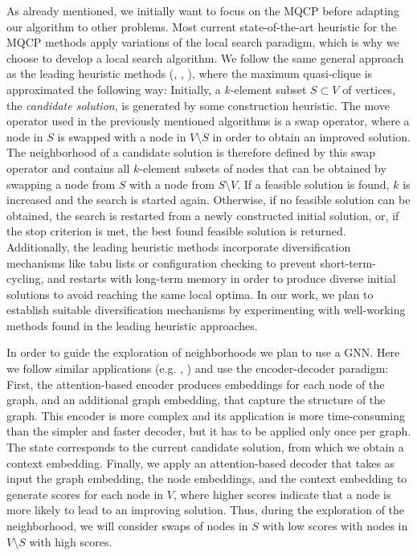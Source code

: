 \documentclass [11pt]{article}
\begin{document}
As already mentioned, we initially want to focus on the MQCP before adapting our algorithm to other problems. Most current state-of-the-art heuristic for the MQCP methods apply variations of the local search paradigm, which is why we choose to develop a local search algorithm. We follow the same general approach as the leading heuristic methods (\cite{djeddi_extension_2019}, \cite{zhou_opposition-based_2020}, \cite{chen_nuqclq_2021}), where the maximum quasi-clique is approximated the following way: Initially, a $k$-element subset $S \subset V$ of vertices, the \textit{candidate solution}, is generated by some construction heuristic. The move operator used in the previously mentioned algorithms is a swap operator, where a node in $S$ is swapped with a node in $V \setminus S$ in order to obtain an improved solution. The neighborhood of a candidate solution is therefore defined by this swap operator and contains all $k$-element subsets of nodes that can be obtained by swapping a node from $S$ with a node from $S \setminus V$. If a feasible solution is found, $k$ is increased and the search is started again. Otherwise, if no feasible solution can be obtained, the search is restarted from a newly constructed initial solution, or, if the stop criterion is met, the best found feasible solution is returned. Additionally, the leading heuristic methods incorporate diversification mechanisms like tabu lists or configuration checking to prevent short-term-cycling, and restarts with long-term memory in order to produce diverse initial solutions to avoid reaching the same local optima. In our work, we plan to establish suitable diversification mechanisms by experimenting with well-working methods found in the leading heuristic approaches. 

In order to guide the exploration of neighborhoods we plan to use a GNN. Here we follow similar applications (e.g. \cite{Kool2019}, \cite{Hudson2021}) and use the encoder-decoder paradigm: First, the attention-based encoder produces embeddings for each node of the graph, and an additional graph embedding, that capture the structure of the graph. This encoder is more complex and its application is more time-consuming than the simpler and faster decoder, but it has to be applied only once per graph. The state corresponds to the current candidate solution, from which we obtain a context embedding. Finally, we apply an attention-based decoder that takes as input the graph embedding, the node embeddings, and the context embedding to generate scores for each node in $V$, where higher scores indicate that a node is more likely to lead to an improving solution. Thus, during the exploration of the neighborhood, we will consider swaps of nodes in $S$ with low scores with nodes in $V \setminus S$ with high scores. 
\end{document}
